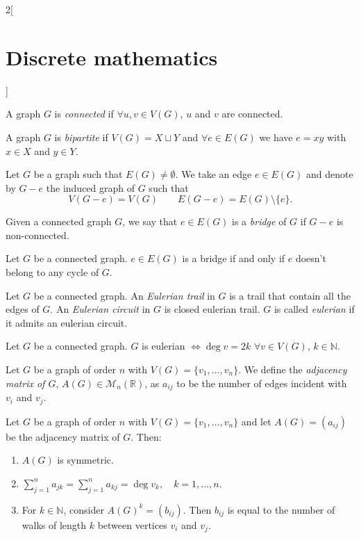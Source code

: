 \documentclass[class=article,10pt,crop=false]{standalone}
\begin{document}
\begin{multicols}{2}[\section{Discrete mathematics}]
\begin{prop}
\end{prop}
\begin{definition}
A graph $G$ is \textit{connected} if $\forall u,v\in V(G)$, $u$ and $v$ are connected.
\end{definition}
\begin{definition}
A graph $G$ is \textit{bipartite} if $V(G)=X\sqcup Y$ and $\forall e\in E(G)$ we have $e=xy$ with $x\in X$ and $y\in Y$.
\end{definition}
\begin{definition}
Let $G$ be a graph such that $E(G)\ne\emptyset$. We take an edge $e\in E(G)$ and denote by $G-e$ the induced graph of $G$ such that $$V(G-e)=V(G)\qquad E(G-e)=E(G)\setminus\{e\}.$$
\end{definition}
\begin{definition}
Given a connected graph $G$, we say that $e\in E(G)$ is a \textit{bridge} of $G$ if $G-e$ is non-connected.
\end{definition}
\begin{prop}
Let $G$ be a connected graph. $e\in E(G)$ is a bridge if and only if $e$ doesn't belong to any cycle of $G$.
\end{prop}
\begin{definition}
Let $G$ be a connected graph. An \textit{Eulerian trail} in $G$ is a trail that contain all the edges of $G$. An \textit{Eulerian circuit} in $G$ is closed eulerian trail. $G$ is called \textit{eulerian} if it admits an eulerian circuit.
\end{definition}
\begin{theorem}
Let $G$ be a connected graph. $G$ is eulerian $\iff\deg v=2k$ $\forall v\in V(G)$, $k\in\mathbb{N}$.
\end{theorem}
\begin{definition}
Let $G$ be a graph of order $n$ with $V(G)=\{v_1,\ldots,v_n\}$. We define the \textit{adjacency matrix of $G$}, $A(G)\in\mathcal{M}_n(\mathbb{R})$, as $a_{ij}$ to be the number of edges incident with $v_i$ and $v_j$.
\end{definition}
\begin{prop}
Let $G$ be a graph of order $n$ with $V(G)=\{v_1,\ldots,v_n\}$ and let $A(G)=(a_{ij})$ be the adjacency matrix of $G$. Then:
\begin{enumerate}
    \item $A(G)$ is symmetric.
    \item $\displaystyle\sum_{j=1}^n a_{jk}=\sum_{j=1}^n a_{kj}=\deg v_k,\quad k=1,\ldots,n$.
    \item For $k\in\mathbb{N}$, consider $A(G)^k=(b_{ij})$. Then $b_{ij}$ is equal to the number of walks of length $k$ between vertices $v_i$ and $v_j$.

\end{enumerate}
\end{prop}
\end{multicols}
\end{document}
